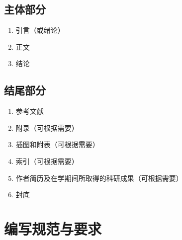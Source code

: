 \documentclass[twoside,longtitle]{LZUthesis}
\begin{document}
\subsection{主体部分}
\begin{enumerate}
\item 引言（或绪论）
\item 正文
\item 结论
\end{enumerate}

\subsection{结尾部分}
\begin{enumerate}
\item 参考文献
\item 附录（可根据需要）
\item 插图和附表（可根据需要）
\item 索引（可根据需要）
\item 作者简历及在学期间所取得的科研成果（可根据需要）
\item 封底
\end{enumerate}

\section{编写规范与要求}
\end{document}
